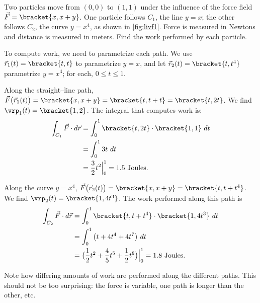 {Two particles move from $(0,0)$ to $(1,1)$ under the influence of the force field $\vec F  =\bracket{x,x+y}$. One particle follows $C_1$, the line $y=x$; the other follows $C_2$, the curve $y=x^4$, as shown in \autoref{fig:livf1}. Force is measured in Newtons and distance is measured in meters. Find the work performed by each particle.}
{To compute work, we need to parametrize each path. We use $\vec r_1(t) =\bracket{t,t}$ to parametrize $y=x$, and let $\vec r_2(t) =\bracket{t,t^4}$ parametrize $y=x^4$; for each, $0\leq t\leq 1$. 

Along the straight--line path, $\vec F\big(\vec r_1(t)\big) =\bracket{x,x+y}=\bracket{t,t+t}=\bracket{t,2t}$. We find $\vrp_1(t) =\bracket{1,2}$. The integral that computes work is:
\begin{align*}
	\int_{C_1} \vec F\cdot d\vec r
	&= \int_0^1\bracket{t,2t}\cdot\bracket{1,1}\ dt \\
	&= \int_0^1 3t\ dt \\
	&= \frac32t^2\Big|_0^1 = 1.5 \text{ Joules}.
\end{align*}

Along the curve $y = x^4$, $\vec F\big(\vec r_2(t)\big) =\bracket{x,x+y}=\bracket{t,t+t^4}$. We find $\vrp_2(t) =\bracket{1,4t^3}$. The work performed along this path is
\begin{align*}
	\int_{C_2} \vec F\cdot d\vec r
	&= \int_0^1\bracket{t,t+t^4}\cdot\bracket{1,4t^3}\ dt\\
	&= \int_0^1 \big(t + 4t^4+ 4t^7\big)\ dt \\
	&= \big(\frac12t^2 + \frac45t^5 + \frac12t^8\big)\Big|_0^1 =  1.8 \text{ Joules}.
\end{align*}

Note how differing amounts of work are performed along the different paths. This should not be too surprising: the force is variable, one path is longer than the other, etc.}


